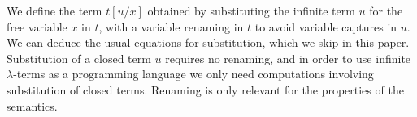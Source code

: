
We define the term $t[u/x]$ obtained by substituting the infinite term $u$ for the 
free variable $x$ in $t$, with a variable renaming in $t$ 
to avoid variable captures in $u$. 
We can deduce the usual equations for substitution, which we skip in this paper. 
Substitution of a closed term $u$ requires no renaming, and  in order to use 
infinite $\lambda$-terms as a programming language we only need computations 
involving substitution of closed terms. Renaming is only relevant for 
the properties of the semantics.

